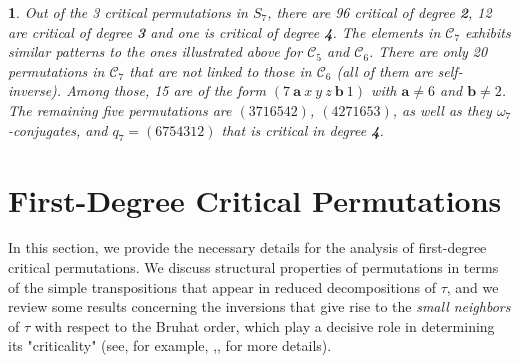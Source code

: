\documentclass[a4 paper,12pt]{article}
\newtheorem{numeris}{}[section]
\begin{document}
\begin{numeris} Out of the 3 critical permutations in $S_7$, there are 96 critical of degree \textbf{\textit{2}}, 12 are critical of degree \textbf{\textit{3}} and one is critical of degree \textbf{\textit{4}}.  
The  elements in  $\mathcal{C}_{7}$ exhibits similar patterns to the ones illustrated above for $\mathcal{C}_{5}$ and $\mathcal{C}_{6}$. There are 
only 20 permutations in $\mathcal{C}_{7}$ that are not linked to those in $\mathcal{C}_{6}$ (all of them are self-inverse). Among those,  15 are of the form 
 $ \left(7 \  \textbf{a} \ x \ y \ z \  \textbf{b} \ 1\right)$ with $\textbf{a}\neq 6$ and  $\textbf{b}\neq 2$.  The remaining five permutations are $(3716542)$, $(4271653)$, as well as they $\omega_7$-conjugates, and  $q_7=(6754312)$ that  is critical  in degree \textit{\textbf{4}}.
\label{Critical_in_S_7}
\end{numeris} 









\section{First-Degree Critical Permutations}
\label{small_N_and_large_simples}
\begin{small}In this section, we provide the necessary details for the analysis of 
first-degree critical permutations.  We discuss structural properties of permutations 
in terms of the simple transpositions that appear in reduced decompositions of $\tau$, and we review some results concerning the  inversions that give rise to the \textit{small neighbors} 
of  $\tau$ with respect to the Bruhat order, which play a decisive role in determining its 
"criticality" (see, for example, \cite{Bjor},\cite{Fed}, \cite{Ten} for more details).\\
\end{small}
\end{document}
